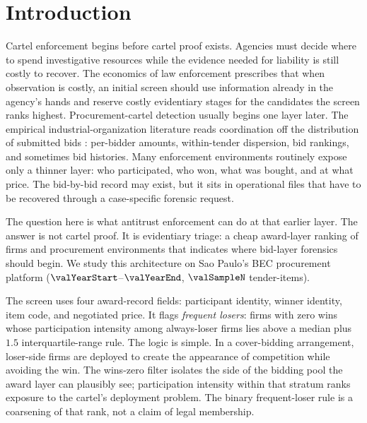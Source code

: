 \section{Introduction}
\label{sec:intro}

Cartel enforcement begins before cartel proof exists. Agencies
must decide where to spend investigative resources while the
evidence needed for liability is still costly to recover. The
economics of law enforcement
\citep{becker1968crime,stigler1970optimum,baker2002case,harrington2008detecting}
prescribes that when observation is costly, an initial screen
should use information already in the agency's hands and reserve
costly evidentiary stages for the candidates the screen ranks
highest. Procurement-cartel detection usually begins one layer
later. The empirical industrial-organization literature reads
coordination off the distribution of submitted bids
\citep{porter1993detection,bajari2003deciding,imhof2019detecting,wallimann2023machine,chassang2022robust}:
per-bidder amounts, within-tender dispersion, bid rankings, and
sometimes bid histories. Many enforcement environments routinely
expose only a thinner layer: who participated, who won, what was
bought, and at what price. The bid-by-bid record may exist, but
it sits in operational files that have to be recovered through
a case-specific forensic request.

The question here is what antitrust enforcement can do at that
earlier layer. The answer is not cartel proof. It is evidentiary
triage: a cheap award-layer ranking of firms and procurement
environments that indicates where bid-layer forensics should
begin. We study this architecture on Sao Paulo's BEC procurement
platform
($\valYearStart$--$\valYearEnd$, $\valSampleN$ tender-items).

The screen uses four award-record fields: participant identity,
winner identity, item code, and negotiated price. It flags
\emph{frequent losers}: firms with zero wins whose participation
intensity among always-loser firms lies above a median plus
$1.5$ interquartile-range rule. The logic is simple. In a
cover-bidding arrangement, loser-side firms are deployed to
create the appearance of competition while avoiding the win. The
wins-zero filter isolates the side of the bidding pool the award
layer can plausibly see; participation intensity within that
stratum ranks exposure to the cartel's deployment problem. The
binary frequent-loser rule is a coarsening of that rank, not a
claim of legal membership.

